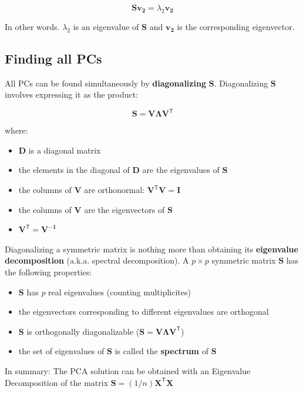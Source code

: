 \documentclass[]{book}
\providecommand{\tightlist}{%
  \setlength{\itemsep}{0pt}\setlength{\parskip}{0pt}}
\begin{document}
\[
\mathbf{S v_2} = \lambda_2 \mathbf{v_2}
\]

In other words. \(\lambda_2\) is an eigenvalue of \(\mathbf{S}\) and \(\mathbf{v_2}\)
is the corresponding eigenvector.

\hypertarget{finding-all-pcs}{%
\subsection{Finding all PCs}\label{finding-all-pcs}}

All PCs can be found simultaneously by \textbf{diagonalizing} \(\mathbf{S}\).
Diagonalizing \(\mathbf{S}\) involves expressing it as the product:

\[ 
\mathbf{S} = \mathbf{V \Lambda V^\mathsf{T}}
\]

where:

\begin{itemize}
\tightlist
\item
  \(\mathbf{D}\) is a diagonal matrix
\item
  the elements in the diagonal of \(\mathbf{D}\) are the eigenvalues of \(\mathbf{S}\)
\item
  the columns of \(\mathbf{V}\) are orthonormal: \(\mathbf{V^\mathsf{T} V= I}\)
\item
  the columns of \(\mathbf{V}\) are the eigenvectors of \(\mathbf{S}\)
\item
  \(\mathbf{V^\mathsf{T}} = \mathbf{V^{-1}}\)
\end{itemize}

Diagonalizing a symmetric matrix is nothing more than obtaining its
\textbf{eigenvalue decomposition} (a.k.a. spectral decomposition).
A \(p \times p\) symmetric matrix \(\mathbf{S}\) has the following properties:

\begin{itemize}
\tightlist
\item
  \(\mathbf{S}\) has \(p\) real eigenvalues (counting multiplicites)
\item
  the eigenvectors corresponding to different eigenvalues are orthogonal
\item
  \(\mathbf{S}\) is orthogonally diagonalizable (\(\mathbf{S} = \mathbf{V \Lambda V^\mathsf{T}}\))
\item
  the set of eigenvalues of \(\mathbf{S}\) is called the \textbf{spectrum} of \(\mathbf{S}\)
\end{itemize}

In summary: The PCA solution can be obtained with an Eigenvalue Decomposition
of the matrix \(\mathbf{S} = (1/n) \mathbf{X^\mathsf{T}X}\)
\end{document}
